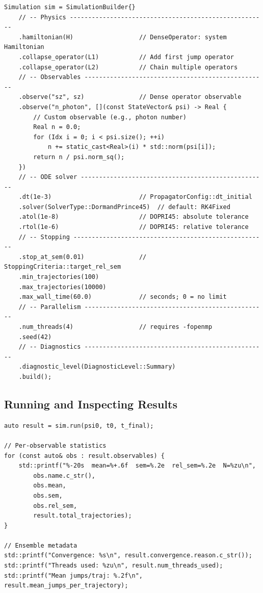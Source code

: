 \documentclass[11pt,a4paper,twoside]{book}
\theoremstyle{definition}
\theoremstyle{remark}
\begin{document}
\begin{verbatim}
Simulation sim = SimulationBuilder{}
    // -- Physics ------------------------------------------------------
    .hamiltonian(H)                  // DenseOperator: system Hamiltonian
    .collapse_operator(L1)           // Add first jump operator
    .collapse_operator(L2)           // Chain multiple operators
    // -- Observables --------------------------------------------------
    .observe("sz", sz)               // Dense operator observable
    .observe("n_photon", [](const StateVector& psi) -> Real {
        // Custom observable (e.g., photon number)
        Real n = 0.0;
        for (Idx i = 0; i < psi.size(); ++i)
            n += static_cast<Real>(i) * std::norm(psi[i]);
        return n / psi.norm_sq();
    })
    // -- ODE solver ---------------------------------------------------
    .dt(1e-3)                        // PropagatorConfig::dt_initial
    .solver(SolverType::DormandPrince45)  // default: RK4Fixed
    .atol(1e-8)                      // DOPRI45: absolute tolerance
    .rtol(1e-6)                      // DOPRI45: relative tolerance
    // -- Stopping -----------------------------------------------------
    .stop_at_sem(0.01)               // StoppingCriteria::target_rel_sem
    .min_trajectories(100)
    .max_trajectories(10000)
    .max_wall_time(60.0)             // seconds; 0 = no limit
    // -- Parallelism --------------------------------------------------
    .num_threads(4)                  // requires -fopenmp
    .seed(42)
    // -- Diagnostics --------------------------------------------------
    .diagnostic_level(DiagnosticLevel::Summary)
    .build();
\end{verbatim}

\subsection{Running and Inspecting Results}
\label{subsec:running-results}

\begin{verbatim}
auto result = sim.run(psi0, t0, t_final);

// Per-observable statistics
for (const auto& obs : result.observables) {
    std::printf("%-20s  mean=%+.6f  sem=%.2e  rel_sem=%.2e  N=%zu\n",
        obs.name.c_str(),
        obs.mean,
        obs.sem,
        obs.rel_sem,
        result.total_trajectories);
}

// Ensemble metadata
std::printf("Convergence: %s\n", result.convergence.reason.c_str());
std::printf("Threads used: %zu\n", result.num_threads_used);
std::printf("Mean jumps/traj: %.2f\n", result.mean_jumps_per_trajectory);
\end{verbatim}
\end{document}
